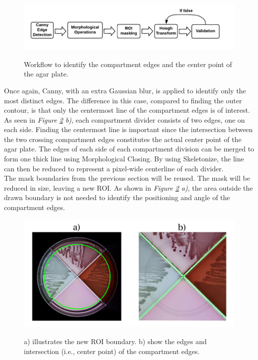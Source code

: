 \begin{figure}[htbp]
    \centering
     \includegraphics[width=0.9\linewidth]{figures/PDF/Identify compartment edges.pdf}\\
    \caption{Workflow to identify the compartment edges and the center point of the agar plate.}
    \label{fig:compartment edges flowchart}
\end{figure}

\noindent Once again, Canny, with an extra Gaussian blur, is applied to identify only the most distinct edges. The difference in this case, compared to finding the outer contour, is that only the centermost line of the compartment edges is of interest. As seen in \textit{Figure \ref{fig:compartment masking} b)}, each compartment divider consists of two edges, one on each side. Finding the centermost line is important since the intersection between the two crossing compartment edges constitutes the actual center point of the agar plate. The edges of each side of each compartment division can be merged to form one thick line using Morphological Closing. By using Skeletonize, the line can then be reduced to represent a pixel-wide centerline of each divider. \\

\noindent The mask boundaries from the previous section will be reused. The mask will be reduced in size, leaving a new ROI. As shown in \textit{Figure \ref{fig:compartment masking} a)}, the area outside the drawn boundary is not needed to identify the positioning and angle of the compartment edges. \\


\begin{figure}[htbp]
    \centering
    \includegraphics[width=.8\linewidth]{figures/PDF/ROI_boundaries.pdf} \\
    \caption{a) illustrates the new ROI boundary. b) show the edges and intersection (i.e., center point) of the compartment edges.}
    \label{fig:compartment masking}
\end{figure}

